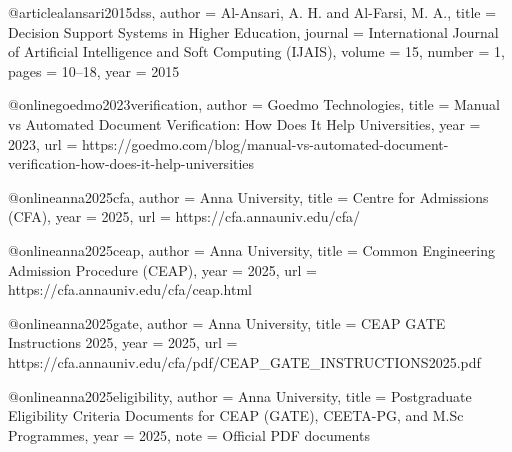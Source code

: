 @article{alansari2015dss,
  author = {Al-Ansari, A. H. and Al-Farsi, M. A.},
  title = {Decision Support Systems in Higher Education},
  journal = {International Journal of Artificial Intelligence and Soft Computing (IJAIS)},
  volume = {15},
  number = {1},
  pages = {10--18},
  year = {2015}
}

@online{goedmo2023verification,
  author = {{Goedmo Technologies}},
  title = {Manual vs Automated Document Verification: How Does It Help Universities},
  year = {2023},
  url = {https://goedmo.com/blog/manual-vs-automated-document-verification-how-does-it-help-universities}
}

@online{anna2025cfa,
  author = {{Anna University}},
  title = {Centre for Admissions (CFA)},
  year = {2025},
  url = {https://cfa.annauniv.edu/cfa/}
}

@online{anna2025ceap,
  author = {{Anna University}},
  title = {Common Engineering Admission Procedure (CEAP)},
  year = {2025},
  url = {https://cfa.annauniv.edu/cfa/ceap.html}
}

@online{anna2025gate,
  author = {{Anna University}},
  title = {CEAP GATE Instructions 2025},
  year = {2025},
  url = {https://cfa.annauniv.edu/cfa/pdf/CEAP_GATE_INSTRUCTIONS2025.pdf}
}

@online{anna2025eligibility,
  author = {{Anna University}},
  title = {Postgraduate Eligibility Criteria Documents for CEAP (GATE), CEETA-PG, and M.Sc Programmes},
  year = {2025},
  note = {Official PDF documents}
}
